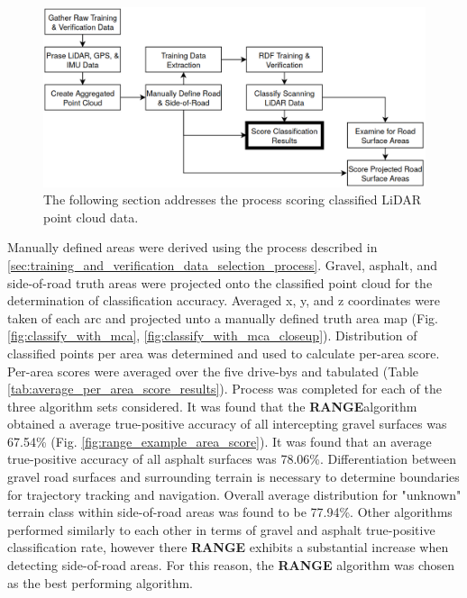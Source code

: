 \documentclass[numbered,pdftex]{ohio-etd}
\begin{document}
{{		\begin{figure}[H]
			\centering
			\includegraphics[width=0.95\linewidth]{Defense_Images/flowz_score_classification}
			\caption[Scoring Classified Point Clouds Flowchart Context]{The following section addresses the process scoring classified LiDAR point cloud data.}
			\label{fig:flowz_score_classification}
		\end{figure}
		
		{Manually defined areas were derived using the process described in \ref{sec:training_and_verification_data_selection_process}. Gravel, asphalt, and side-of-road truth areas were projected onto the classified point cloud for the determination of classification accuracy. Averaged x, y, and z coordinates were taken of each arc and projected unto a manually defined truth area map (Fig. \ref{fig:classify_with_mca}, \ref{fig:classify_with_mca_closeup}). Distribution of classified points per area was determined and used to calculate per-area score. Per-area scores were averaged over the five drive-bys and tabulated (Table \ref{tab:average_per_area_score_results}). Process was completed for each of the three algorithm sets considered. It was found that the \textbf{RANGE}\footnotemark algorithm obtained a average true-positive accuracy of all intercepting gravel surfaces was 67.54\% (Fig. \ref{fig:range_example_area_score}). It was found that an average true-positive accuracy of all asphalt surfaces was 78.06\%. Differentiation between gravel road surfaces and surrounding terrain is necessary to determine boundaries for trajectory tracking and navigation. Overall average distribution for "unknown" terrain class within side-of-road areas was found to be 77.94\%. Other algorithms performed similarly to each other in terms of gravel and asphalt true-positive classification rate, however there \textbf{RANGE} exhibits a substantial increase when detecting side-of-road areas. For this reason, the \textbf{RANGE} algorithm was chosen as the best performing algorithm.}
		
}}
\end{document}
